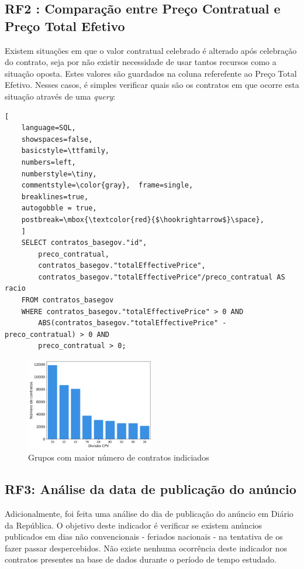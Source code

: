 \subsection{RF2 : Comparação entre Preço Contratual e Preço Total Efetivo}

Existem situações em que o valor contratual celebrado é alterado após celebração do contrato, seja por não existir necessidade de usar tantos recursos como a situação oposta. Estes valores são guardados na coluna referefente ao Preço Total Efetivo. Nesses casos, é simples verificar quais são os contratos em que ocorre esta situação através de uma \textit{query}: 

\begin{lstlisting}[
	language=SQL,
	showspaces=false,
	basicstyle=\ttfamily,
	numbers=left,
	numberstyle=\tiny,
	commentstyle=\color{gray},	frame=single,
	breaklines=true,
	autogobble = true,
	postbreak=\mbox{\textcolor{red}{$\hookrightarrow$}\space},
	]
	SELECT contratos_basegov."id", 
		preco_contratual, 
		contratos_basegov."totalEffectivePrice", 
		contratos_basegov."totalEffectivePrice"/preco_contratual AS racio
	FROM contratos_basegov 
	WHERE contratos_basegov."totalEffectivePrice" > 0 AND 
		ABS(contratos_basegov."totalEffectivePrice" - preco_contratual) > 0 AND 
		preco_contratual > 0;
\end{lstlisting}


\begin{figure}[H]
	\centering
	\includegraphics[width=0.5\textwidth]{imagens/rf2/main_cpvs.png}
	\caption{Grupos com maior número de contratos indiciados}
	\label{}
\end{figure}



\subsection{RF3: Análise da data de publicação do anúncio}

Adicionalmente, foi feita uma análise do dia de publicação do anúncio em Diário da República. O objetivo deste indicador é verificar se existem anúncios publicados em dias não convencionais - feriados nacionais - na tentativa de os fazer passar despercebidos. Não existe nenhuma ocorrência deste indicador nos contratos presentes na base de dados durante o período de tempo estudado. 




